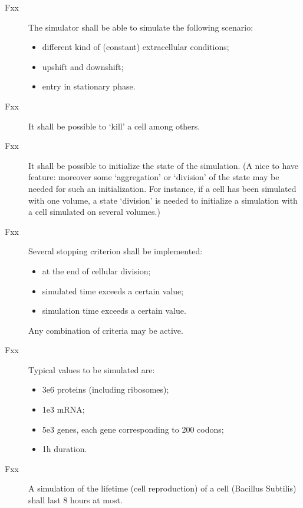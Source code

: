 \begin{description}
  \item[Fxx] The simulator shall be able to simulate the following scenario:
  \begin{itemize}
    \item different kind of (constant) extracellular conditions;
    \item upshift and downshift;
    \item entry in stationary phase.
  \end{itemize}
  \item[Fxx] It shall be possible to ‘kill’ a cell among others.
  \item[Fxx] It shall be possible to initialize the state of the simulation. (A nice to have feature: moreover some ‘aggregation’ or ‘division’ of the state may be needed for such an initialization. For instance, if a cell has been simulated with one volume, a state ‘division’ is needed to initialize a simulation with a cell simulated on several volumes.)
  \item[Fxx] Several stopping criterion shall be implemented:
  \begin{itemize}
    \item at the end of cellular division;
    \item simulated time exceeds a certain value;
    \item simulation time exceeds a certain value.
  \end{itemize}
      Any combination of criteria may be active.
  \item[Fxx] Typical values to be simulated are:
  \begin{itemize}
    \item 3e6 proteins (including ribosomes);
    \item 1e3 mRNA;
    \item 5e3 genes, each gene corresponding to 200 codons;
    \item 1h duration.
  \end{itemize}
  \item[Fxx] A simulation of the lifetime (cell reproduction) of a cell (Bacillus Subtilis) shall last 8 hours at most.
  \\


\end{description}
